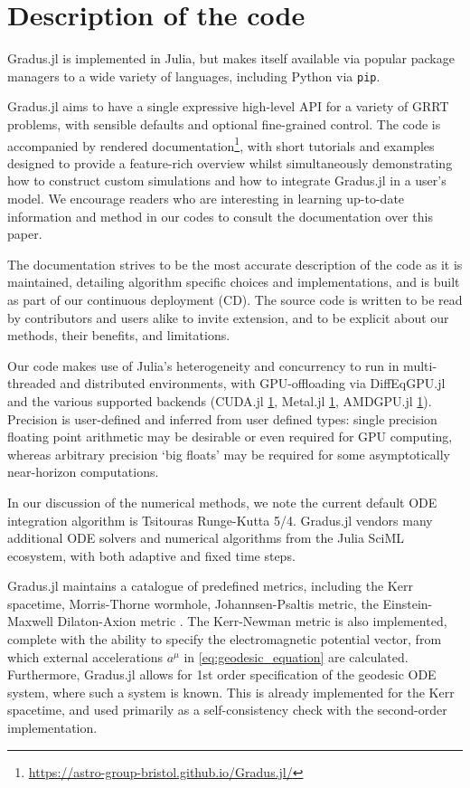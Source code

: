 \section{Description of the code}

Gradus.jl is implemented in Julia, but makes itself available via popular package managers to a wide variety of languages, including Python via \texttt{pip}.

Gradus.jl aims to have a single expressive high-level API for a variety of GRRT problems, with sensible defaults and optional fine-grained control. The code is accompanied by rendered documentation\footnote{\url{https://astro-group-bristol.github.io/Gradus.jl/}}, with short tutorials and examples designed to provide a feature-rich overview whilst simultaneously demonstrating how to construct custom simulations and how to integrate Gradus.jl in a user's model. We encourage readers who are interesting in learning up-to-date information and method in our codes to consult the documentation over this paper. 

The documentation strives to be the most accurate description of the code as it is maintained, detailing algorithm specific choices and implementations, and is built as part of our continuous deployment (CD). The source code is written to be read by contributors and users alike to invite extension, and to be explicit about our methods, their benefits, and limitations.

Our code makes use of Julia's heterogeneity and concurrency to run in multi-threaded and distributed environments, with GPU-offloading via DiffEqGPU.jl and the various supported backends (CUDA.jl \ref{}, Metal.jl \ref{}, AMDGPU.jl \ref{}). Precision is user-defined and inferred from user defined types: single precision floating point arithmetic may be desirable or even required for GPU computing, whereas arbitrary precision `big floats' may be required for some asymptotically near-horizon computations.

In our discussion of the numerical methods, we note the current default ODE integration algorithm is Tsitouras Runge-Kutta 5/4. Gradus.jl vendors many additional ODE solvers and numerical algorithms from the Julia SciML ecosystem, with both adaptive and fixed time steps.

Gradus.jl maintains a catalogue of predefined metrics, including the Kerr spacetime, Morris-Thorne wormhole, Johannsen-Psaltis metric, the Einstein-Maxwell Dilaton-Axion metric . The Kerr-Newman metric is also implemented, complete with the ability to specify the electromagnetic potential vector, from which external accelerations $a^\mu$ in \eqref{eq:geodesic_equation} are calculated. Furthermore, Gradus.jl allows for 1st order specification of the geodesic ODE system, where such a system is known. This is already implemented for the Kerr spacetime, and used primarily as a self-consistency check with the second-order implementation.

